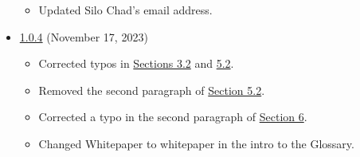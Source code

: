\documentclass[class=article, crop=false]{standalone}
\begin{document}
\begin{itemize}[topsep=0pt, itemsep=3pt,leftmargin=16pt]
\begin{itemize}
        \item Updated Silo Chad's email address. 
    \end{itemize}
    \item \href{https://github.com/BeanstalkFarms/Pipeline-Whitepaper/blob/master/version-history/pipeline1_0_4.pdf}{1.0.4} (November 17, 2023)
    \begin{itemize}
        \item Corrected typos in \hyperlink{subsection.3.2}{Sections 3.2} and \hyperlink{subsection.5.2}{5.2}.
        \item Removed the second paragraph of \hyperlink{subsection.5.2}{Section 5.2}.
        \item Corrected a typo in the second paragraph of \hyperlink{section.6}{Section 6}.
        \item Changed Whitepaper to whitepaper in the intro to the Glossary.
    \end{itemize}
    
\end{itemize}
\end{document}
